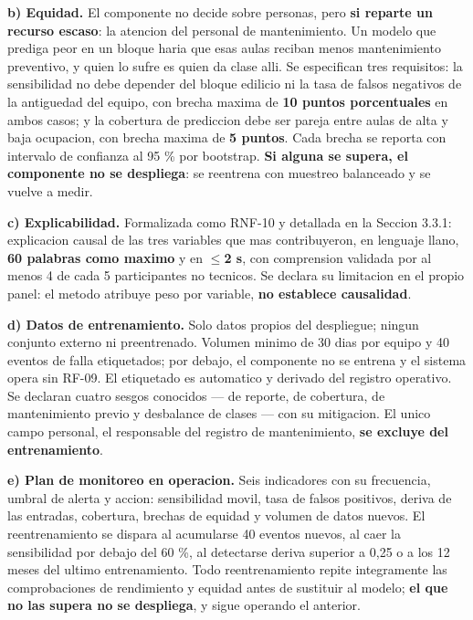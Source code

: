 \medskip
\noindent\textbf{b) Equidad.} El componente no decide sobre personas, pero \textbf{si
reparte un recurso escaso}: la atencion del personal de mantenimiento. Un modelo que
prediga peor en un bloque haria que esas aulas reciban menos mantenimiento preventivo, y
quien lo sufre es quien da clase alli. Se especifican tres requisitos: la sensibilidad no
debe depender del bloque edilicio ni la tasa de falsos negativos de la antiguedad del
equipo, con brecha maxima de \textbf{10 puntos porcentuales} en ambos casos; y la
cobertura de prediccion debe ser pareja entre aulas de alta y baja ocupacion, con brecha
maxima de \textbf{5 puntos}. Cada brecha se reporta con intervalo de confianza al 95 \%
por bootstrap. \textbf{Si alguna se supera, el componente no se despliega}: se reentrena
con muestreo balanceado y se vuelve a medir.

\medskip
\noindent\textbf{c) Explicabilidad.} Formalizada como RNF-10 y detallada en la
Seccion 3.3.1: explicacion causal de las tres variables que mas contribuyeron, en lenguaje
llano, \textbf{60 palabras como maximo} y en \textbf{$\leq$2 s}, con comprension validada
por al menos 4 de cada 5 participantes no tecnicos. Se declara su limitacion en el propio
panel: el metodo atribuye peso por variable, \textbf{no establece causalidad}.

\medskip
\noindent\textbf{d) Datos de entrenamiento.} Solo datos propios del despliegue; ningun
conjunto externo ni preentrenado. Volumen minimo de 30 dias por equipo y 40 eventos de
falla etiquetados; por debajo, el componente no se entrena y el sistema opera sin RF-09.
El etiquetado es automatico y derivado del registro operativo. Se declaran cuatro sesgos
conocidos --- de reporte, de cobertura, de mantenimiento previo y desbalance de clases ---
con su mitigacion. El unico campo personal, el responsable del registro de mantenimiento,
\textbf{se excluye del entrenamiento}.

\medskip
\noindent\textbf{e) Plan de monitoreo en operacion.} Seis indicadores con su frecuencia,
umbral de alerta y accion: sensibilidad movil, tasa de falsos positivos, deriva de las
entradas, cobertura, brechas de equidad y volumen de datos nuevos. El reentrenamiento se
dispara al acumularse 40 eventos nuevos, al caer la sensibilidad por debajo del 60 \%, al
detectarse deriva superior a 0,25 o a los 12 meses del ultimo entrenamiento. Todo
reentrenamiento repite integramente las comprobaciones de rendimiento y equidad antes de
sustituir al modelo; \textbf{el que no las supera no se despliega}, y sigue operando el
anterior.

